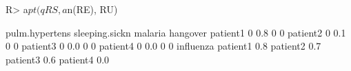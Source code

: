 \begin{Schunk}
% --begin: "comp.quant.combined"
\begin{Sinput}
R> a$pt(qRS, a$n(RE), RU)
\end{Sinput}
\begin{Soutput}
         pulm.hypertens sleeping.sickn malaria hangover
patient1              0            0.8       0        0
patient2              0            0.1       0        0
patient3              0            0.0       0        0
patient4              0            0.0       0        0
         influenza
patient1       0.8
patient2       0.7
patient3       0.6
patient4       0.0
\end{Soutput}
%
% --end: "comp.quant.combined"
\end{Schunk}
